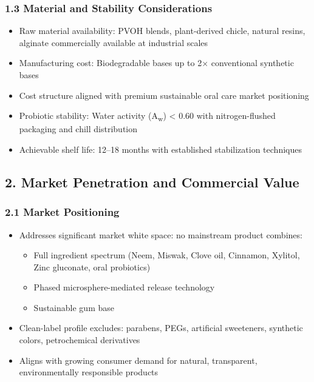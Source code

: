 \documentclass[12pt]{article}
\begin{document}
\subsubsection*{1.3 Material and Stability Considerations}
\begin{itemize}
    \item Raw material availability: PVOH blends, plant-derived chicle, natural resins, alginate commercially available at industrial scales
    \item Manufacturing cost: Biodegradable bases up to 2$\times$ conventional synthetic bases
    \item Cost structure aligned with premium sustainable oral care market positioning
    \item Probiotic stability: Water activity (A\textsubscript{w}) < 0.60 with nitrogen-flushed packaging and chill distribution
    \item Achievable shelf life: 12--18 months with established stabilization techniques
\end{itemize}

\subsection*{2. Market Penetration and Commercial Value}

\subsubsection*{2.1 Market Positioning}
\begin{itemize}
    \item Addresses significant market white space: no mainstream product combines:
    \begin{itemize}
        \item Full ingredient spectrum (Neem, Miswak, Clove oil, Cinnamon, Xylitol, Zinc gluconate, oral probiotics)
        \item Phased microsphere-mediated release technology
        \item Sustainable gum base
    \end{itemize}
    \item Clean-label profile excludes: parabens, PEGs, artificial sweeteners, synthetic colors, petrochemical derivatives
    \item Aligns with growing consumer demand for natural, transparent, environmentally responsible products
\end{itemize}
\end{document}
